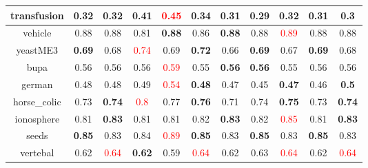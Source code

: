 \documentclass{article}%
\begin{document}
\begin{tabular}{c|cccccccccc}
\hline%
transfusion&0.32&0.32&0.41&\textcolor{red}{ 
0.45
}&\textbf{0.34}&0.31&0.29&\textbf{0.32}&\textbf{0.31}&0.3\\%
\hline%
vehicle&0.88&0.88&0.81&\textbf{0.88}&0.86&\textbf{0.88}&0.88&\textcolor{red}{ 
0.89
}&0.88&0.88\\%
\hline%
yeastME3&\textbf{0.69}&0.68&\textcolor{red}{ 
0.74
}&0.69&\textbf{0.72}&0.66&\textbf{0.69}&0.67&\textbf{0.69}&0.68\\%
\hline%
bupa&0.56&0.56&0.56&\textcolor{red}{ 
0.59
}&0.55&\textbf{0.56}&\textbf{0.56}&0.55&0.56&0.56\\%
\hline%
german&0.48&0.48&0.49&\textcolor{red}{ 
0.54
}&\textbf{0.48}&0.47&0.45&\textbf{0.47}&0.46&\textbf{0.5}\\%
\hline%
horse\_colic&0.73&\textbf{0.74}&\textcolor{red}{ 
0.8
}&0.77&\textbf{0.76}&0.71&0.74&\textbf{0.75}&0.73&\textbf{0.74}\\%
\hline%
ionosphere&0.81&\textbf{0.83}&0.81&0.81&0.82&\textbf{0.83}&0.82&\textcolor{red}{ 
0.85
}&0.81&\textbf{0.83}\\%
\hline%
seeds&\textbf{0.85}&0.83&0.84&\textcolor{red}{ 
0.89
}&\textbf{0.85}&0.83&\textbf{0.85}&0.83&\textbf{0.85}&0.83\\%
\hline%
vertebal&0.62&\textcolor{red}{ 
0.64
}&\textbf{0.62}&0.59&\textcolor{red}{ 
0.64
}&0.62&0.63&\textcolor{red}{ 
0.64
}&0.62&\textcolor{red}{ 
0.64
}\\%
\hline%
\end{tabular}

%
\end{document}

